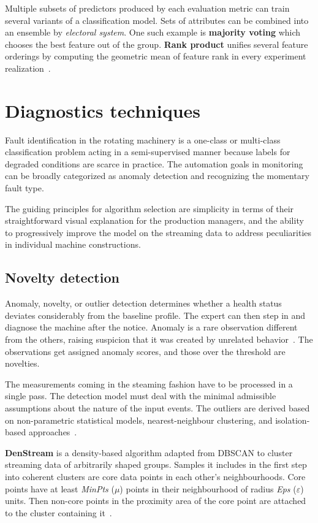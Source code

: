 Multiple subsets of predictors produced by each evaluation metric can train several variants of a classification model. Sets of attributes can be combined into an ensemble by \emph{electoral system}. One such example is \textbf{majority voting} which chooses the best feature out of the group. \textbf{Rank product} unifies several feature orderings by computing the geometric mean of feature rank in every experiment realization~\cite{breitling_rank_2004}.

\section{Diagnostics techniques} \label{section:diagnostics-techniques}
Fault identification in the rotating machinery is a one-class or multi-class classification problem acting in a semi-supervised manner because labels for degraded conditions are scarce in practice. The automation goals in monitoring can be broadly categorized as anomaly detection and recognizing the momentary fault type.

The guiding principles for algorithm selection are simplicity in terms of their straightforward visual explanation for the production managers, and the ability to progressively improve the model on the streaming data to address peculiarities in individual machine constructions.

\subsection{Novelty detection}
Anomaly, novelty, or outlier detection determines whether a health status deviates considerably from the baseline profile. The expert can then step in and diagnose the machine after the notice. Anomaly is a rare observation different from the others, raising suspicion that it was created by unrelated behavior~\cite{aggarwal_outlier_2016}. The observations get assigned anomaly scores, and those over the threshold are novelties.

The measurements coming in the steaming fashion have to be processed in a single pass. The detection model must deal with the minimal admissible assumptions about the nature of the input events. The outliers are derived based on non-parametric statistical models, nearest-neighbour clustering, and isolation-based approaches~\cite{gervasi_anomaly_2020}.
\bigbreak

\textbf{DenStream} is a density-based algorithm adapted from DBSCAN to cluster streaming data of arbitrarily shaped groups. Samples it includes in the first step into coherent clusters are core data points in each other's neighbourhoods. Core points have at least \emph{MinPts} ($\mu$) points in their neighbourhood of radius \emph{Eps} ($\varepsilon$) units. Then non-core points in the proximity area of the core point are attached to the cluster containing it~\cite{aggarwal_data_2014}.

